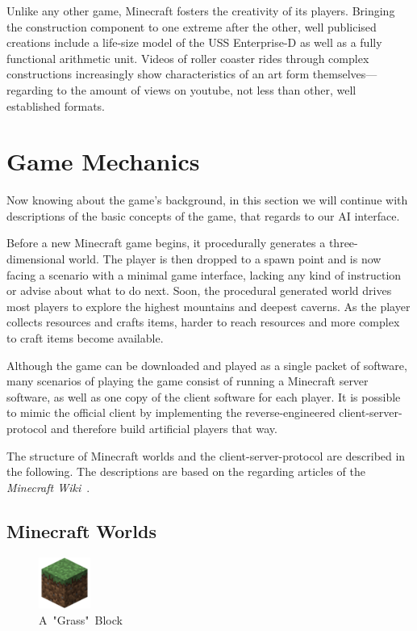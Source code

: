 Unlike any other game, Minecraft fosters the creativity of its players. Bringing the construction component to one extreme after the other, well publicised creations include a life-size model of the USS Enterprise-D as well as a fully functional arithmetic unit. Videos of roller coaster rides through complex constructions increasingly show characteristics of an art form themselves---regarding to the amount of views on youtube, not less than other, well established formats.

    \section{Game Mechanics}
Now knowing about the game's background, in this section we will continue with descriptions of the basic concepts of the game, that regards to our AI interface. 

Before a new Minecraft game begins, it procedurally generates a three-dimensional world. The player is then dropped to a spawn point and is now facing a scenario with a minimal game interface, lacking any kind of instruction or advise about what to do next. Soon, the procedural generated world drives most players to explore the highest mountains and deepest caverns. As the player collects resources and crafts items, harder to reach resources and more complex to craft items  become available.~\cite{Duncan:2011:MBC:2207096.2207097}

Although the game can be downloaded and played as a single packet of software, many scenarios of playing the game consist of running a Minecraft server software, as well as one copy of the client software for each player. It is possible to mimic the official client by implementing the reverse-engineered client-server-protocol and therefore build artificial players that way.

The structure of Minecraft worlds and the client-server-protocol are described in the following. The descriptions are based on the regarding articles of the \emph{Minecraft Wiki}~\cite{mcwiki}.

    \subsection{Minecraft Worlds}

\begin{figure}
  \begin{center}
    \includegraphics[width=0.15\textwidth]{graphics/block}
  \end{center}
  \caption{A~"Grass"~Block~\cite{image_mob}}
  \label{mc_block}
\end{figure}

